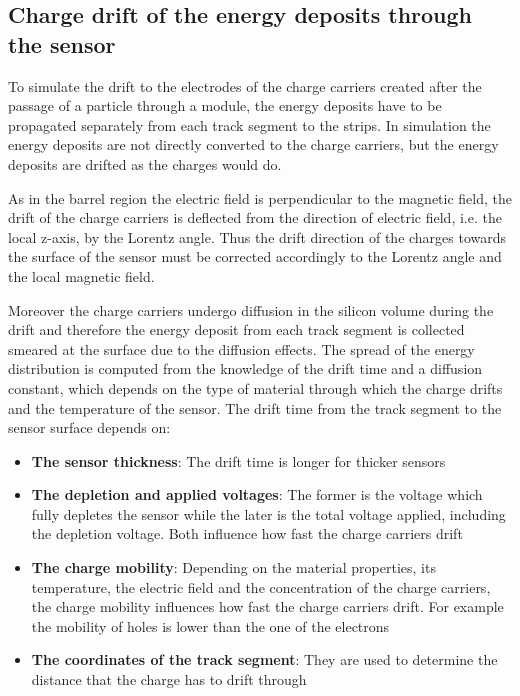 \subsection{Charge drift of the energy deposits through the sensor~\label{sec:drift}}

To simulate  the drift to the electrodes of the charge carriers created after the passage of a particle through a module, the energy deposits have to be propagated separately from each track segment to the strips. In simulation the energy deposits are not directly converted to the charge carriers, but the energy deposits are drifted as the charges would do. 

As in the barrel region the electric field is perpendicular to the magnetic field, the drift of the charge carriers is deflected from the direction of electric field, i.e. the local z-axis, by the Lorentz angle. Thus the drift direction of the charges towards the surface of the sensor must be corrected accordingly to the Lorentz angle and the local magnetic field. 

Moreover the charge carriers undergo diffusion in the silicon volume during the drift and therefore the energy deposit from each track segment is collected smeared at the surface due to the diffusion effects. The spread of the energy distribution is computed from the knowledge of the drift time and a diffusion constant, which depends on the type of material through which the charge drifts and the temperature of the sensor. The drift time from the track segment to the sensor surface depends on:

\begin{itemize}
\item \textbf{The sensor thickness}: The drift time is longer for thicker sensors
\item \textbf{The depletion and applied voltages}:  The former is the voltage which fully depletes the sensor while the later is the total voltage applied, including the depletion voltage. Both influence how fast the charge carriers drift
\item \textbf{The charge mobility}: Depending on the material properties, its temperature, the electric field and the concentration of the charge carriers, the charge mobility influences how fast the charge carriers drift. For example the mobility of holes is lower than the one of the electrons
\item \textbf{The coordinates of the track segment}: They are used to determine the distance that the charge  has to drift through
\end{itemize}


